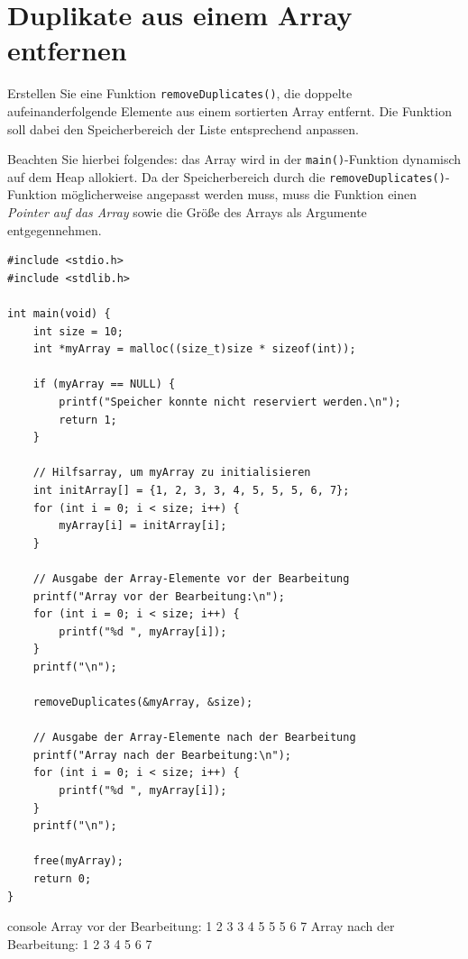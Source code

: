 \chapter{Duplikate aus einem Array entfernen}

\vspace{10pt}

Erstellen Sie eine Funktion \texttt{removeDuplicates()}, die doppelte
aufeinanderfolgende Elemente aus einem sortierten Array entfernt. Die Funktion
soll dabei den Speicherbereich der Liste entsprechend anpassen.

Beachten Sie hierbei folgendes: das Array wird in der
\texttt{main()}-Funktion dynamisch auf dem Heap allokiert. Da der
Speicherbereich durch die \texttt{removeDuplicates()}-Funktion
möglicherweise angepasst werden muss, muss die Funktion einen \textit{Pointer
auf das Array} sowie die Größe des Arrays als Argumente entgegennehmen.

\Vorlage
\begin{verbatim}
#include <stdio.h>
#include <stdlib.h>

int main(void) {
    int size = 10;
    int *myArray = malloc((size_t)size * sizeof(int));

    if (myArray == NULL) {
        printf("Speicher konnte nicht reserviert werden.\n");
        return 1;
    }

    // Hilfsarray, um myArray zu initialisieren
    int initArray[] = {1, 2, 3, 3, 4, 5, 5, 5, 6, 7};
    for (int i = 0; i < size; i++) {
        myArray[i] = initArray[i];
    }

    // Ausgabe der Array-Elemente vor der Bearbeitung
    printf("Array vor der Bearbeitung:\n");
    for (int i = 0; i < size; i++) {
        printf("%d ", myArray[i]);
    }
    printf("\n");

    removeDuplicates(&myArray, &size);

    // Ausgabe der Array-Elemente nach der Bearbeitung
    printf("Array nach der Bearbeitung:\n");
    for (int i = 0; i < size; i++) {
        printf("%d ", myArray[i]);
    }
    printf("\n");

    free(myArray);
    return 0;
}
\end{verbatim}

\begin{mybox}[Bildschirmausgabe]{console}
Array vor der Bearbeitung:
1 2 3 3 4 5 5 5 6 7
Array nach der Bearbeitung:
1 2 3 4 5 6 7
\end{mybox}







